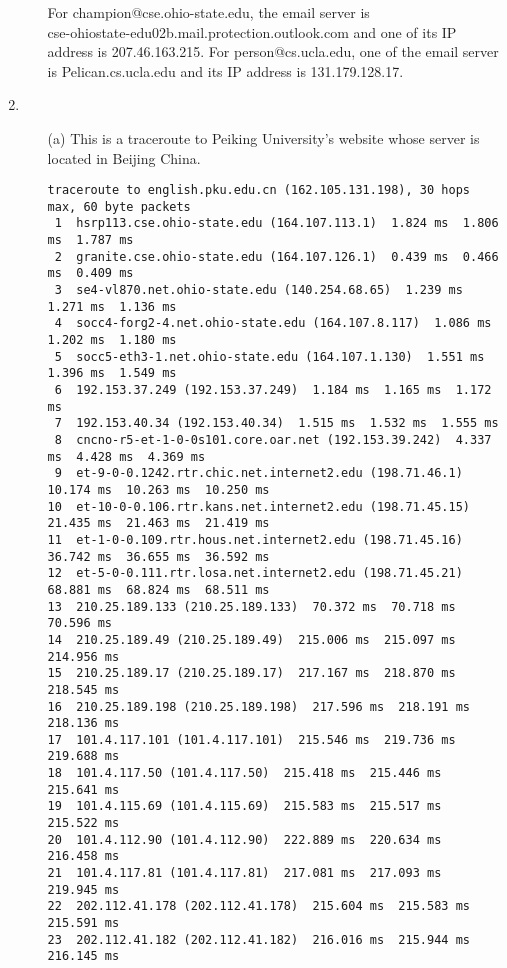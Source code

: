 \documentclass[12pt]{article}
\begin{document}
\begin{singlespace}
\begin{enumerate}
\begin{itemize}
\begin{lstlisting}
		\end{lstlisting}
	For champion@cse.ohio-state.edu, the email server is \\cse-ohiostate-edu02b.mail.protection.outlook.com and one of its IP address is 207.46.163.215.
	For person@cs.ucla.edu, one of the email server is Pelican.cs.ucla.edu and its IP address is 131.179.128.17.
	\end{itemize}
\item
	\begin{itemize}
	\item[(a)]
	This is a traceroute to Peiking University's website whose server is located in Beijing China.
		\begin{lstlisting}[basicstyle=\ttfamily\scriptsize]
% traceroute english.pku.edu.cn
traceroute to english.pku.edu.cn (162.105.131.198), 30 hops max, 60 byte packets
 1  hsrp113.cse.ohio-state.edu (164.107.113.1)  1.824 ms  1.806 ms  1.787 ms
 2  granite.cse.ohio-state.edu (164.107.126.1)  0.439 ms  0.466 ms  0.409 ms
 3  se4-vl870.net.ohio-state.edu (140.254.68.65)  1.239 ms  1.271 ms  1.136 ms
 4  socc4-forg2-4.net.ohio-state.edu (164.107.8.117)  1.086 ms  1.202 ms  1.180 ms
 5  socc5-eth3-1.net.ohio-state.edu (164.107.1.130)  1.551 ms  1.396 ms  1.549 ms
 6  192.153.37.249 (192.153.37.249)  1.184 ms  1.165 ms  1.172 ms
 7  192.153.40.34 (192.153.40.34)  1.515 ms  1.532 ms  1.555 ms
 8  cncno-r5-et-1-0-0s101.core.oar.net (192.153.39.242)  4.337 ms  4.428 ms  4.369 ms
 9  et-9-0-0.1242.rtr.chic.net.internet2.edu (198.71.46.1)  10.174 ms  10.263 ms  10.250 ms
10  et-10-0-0.106.rtr.kans.net.internet2.edu (198.71.45.15)  21.435 ms  21.463 ms  21.419 ms
11  et-1-0-0.109.rtr.hous.net.internet2.edu (198.71.45.16)  36.742 ms  36.655 ms  36.592 ms
12  et-5-0-0.111.rtr.losa.net.internet2.edu (198.71.45.21)  68.881 ms  68.824 ms  68.511 ms
13  210.25.189.133 (210.25.189.133)  70.372 ms  70.718 ms  70.596 ms
14  210.25.189.49 (210.25.189.49)  215.006 ms  215.097 ms  214.956 ms
15  210.25.189.17 (210.25.189.17)  217.167 ms  218.870 ms  218.545 ms
16  210.25.189.198 (210.25.189.198)  217.596 ms  218.191 ms  218.136 ms
17  101.4.117.101 (101.4.117.101)  215.546 ms  219.736 ms  219.688 ms
18  101.4.117.50 (101.4.117.50)  215.418 ms  215.446 ms  215.641 ms
19  101.4.115.69 (101.4.115.69)  215.583 ms  215.517 ms  215.522 ms
20  101.4.112.90 (101.4.112.90)  222.889 ms  220.634 ms  216.458 ms
21  101.4.117.81 (101.4.117.81)  217.081 ms  217.093 ms  219.945 ms
22  202.112.41.178 (202.112.41.178)  215.604 ms  215.583 ms  215.591 ms
23  202.112.41.182 (202.112.41.182)  216.016 ms  215.944 ms  216.145 ms

\end{lstlisting}
\end{itemize}
\end{enumerate}
\end{singlespace}
\end{document}
